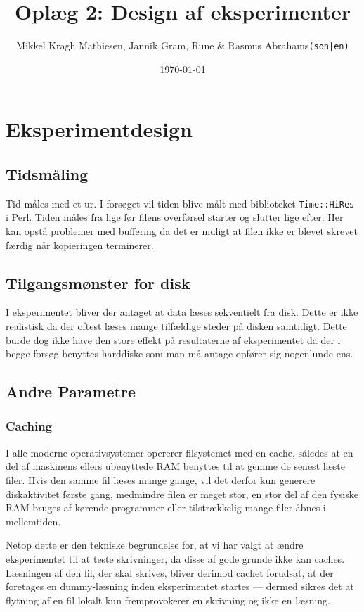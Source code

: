 \documentclass{article}
\author{Mikkel Kragh Mathiesen, Jannik Gram, Rune \& Rasmus Abrahams{\tt (son|en)}}
\title{Oplæg 2: Design af eksperimenter}
\date{\today}
\begin{document}
\maketitle

\tableofcontents

\section{Eksperimentdesign}

\subsection{Tidsmåling}
Tid måles med et ur. I forsøget vil tiden blive målt med biblioteket {\tt Time::HiRes} i Perl. Tiden måles fra lige før filens overførsel starter og slutter lige efter. Her kan opstå problemer med buffering da det er muligt at filen ikke er blevet skrevet færdig når kopieringen terminerer.

\subsection{Tilgangsmønster for disk}
I eksperimentet bliver der antaget at data læses sekventielt fra disk. Dette er ikke realistisk da der oftest læses mange tilfældige steder på disken samtidigt. Dette burde dog ikke have den store effekt på resultaterne af eksperimentet da der i begge forsøg benyttes harddiske som man må antage opfører sig nogenlunde ens.

\subsection{Andre Parametre}
\subsubsection{Caching}
I alle moderne operativsystemer opererer filsystemet med en cache, således at en del af maskinens ellers ubenyttede RAM benyttes til at gemme de senest læste filer. Hvis den samme fil læses mange gange, vil det derfor kun generere diskaktivitet første gang, medmindre filen er meget stor, en stor del af den fysiske RAM bruges af kørende programmer eller tilstrækkelig mange filer åbnes i mellemtiden.

Netop dette er den tekniske begrundelse for, at vi har valgt at ændre eksperimentet til at teste skrivninger, da disse af gode grunde ikke kan caches. Læsningen af den fil, der skal skrives, bliver derimod cachet forudsat, at der foretages en dummy-læsning inden eksperimentet startes --- dermed sikres det at flytning af en fil lokalt kun fremprovokerer en skrivning og ikke en læsning.
\end{document}
